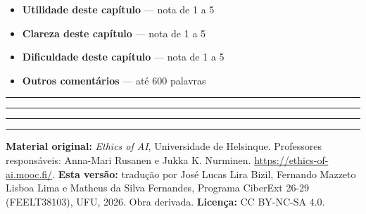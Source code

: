 \documentclass[
  11pt,
]{article}
\providecommand{\tightlist}{%
  \setlength{\itemsep}{0pt}\setlength{\parskip}{0pt}}
\newcommand{\faixaEixos}[1][\linewidth]{%
  \noindent
  \textcolor{iaConceitos}{\rule{0.3333#1}{4pt}}%
  \textcolor{iaAplic}{\rule{0.3333#1}{4pt}}%
  \textcolor{iaRiscos}{\rule{0.3333#1}{4pt}}%
  \par}
\newenvironment{licenca}
  {\par\vspace{2em}\faixaEixos\par\vspace{0.8em}
   \begingroup\sffamily\scriptsize\color{iaTintaFraca}}
  {\endgroup\par}
\begin{document}
\begin{itemize}
\tightlist
\item
  \textbf{Utilidade deste capítulo} --- nota de 1 a 5
\item
  \textbf{Clareza deste capítulo} --- nota de 1 a 5
\item
  \textbf{Dificuldade deste capítulo} --- nota de 1 a 5
\item
  \textbf{Outros comentários} --- até 600 palavras
\end{itemize}

\begin{center}\rule{0.5\linewidth}{0.5pt}\end{center}

\begin{licenca}

\textbf{Material original:} \emph{Ethics of AI}, Universidade de
Helsinque. Professores responsáveis: Anna-Mari Rusanen e Jukka K.
Nurminen. \url{https://ethics-of-ai.mooc.fi/}. \textbf{Esta versão:}
tradução por José Lucas Lira Bizil, Fernando Mazzeto Lisboa Lima e
Matheus da Silva Fernandes, Programa CiberExt 26-29 (FEELT38103), UFU,
2026. Obra derivada. \textbf{Licença:} CC BY-NC-SA 4.0.

\end{licenca}
\end{document}
